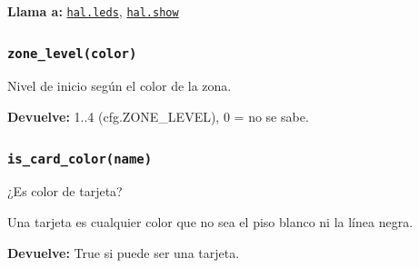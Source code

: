 \par{}\par\smallskip
\noindent\textbf{Llama a:} \hyperref[fn:hal:leds]{\texttt{hal.leds}}, \hyperref[fn:hal:show]{\texttt{hal.show}}\par

\subsubsection{\texttt{zone\_\allowbreak{}level(color)}}\label{fn:colors:zone-level}
\noindent Nivel de inicio según el color de la zona.

\par{}\par\smallskip
\noindent\textbf{Devuelve:} 1..4 (cfg.ZONE\_LEVEL), 0 = no se sabe.\par

\subsubsection{\texttt{is\_\allowbreak{}card\_\allowbreak{}color(name)}}\label{fn:colors:is-card-color}
\noindent ¿Es color de tarjeta?

Una tarjeta es cualquier color que no sea el piso blanco ni la línea negra.

\par{}\par\smallskip
\noindent\textbf{Devuelve:} True si puede ser una tarjeta.\par


